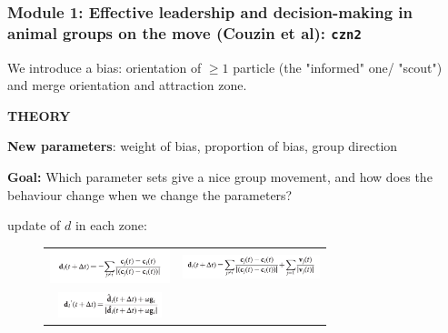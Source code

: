 \documentclass[compress]{beamer}
\begin{document}

\begin{frame}
  \frametitle{Module 1: Effective leadership and decision-making in animal groups on the move (Couzin et al): \texttt{czn2}}
  
  We introduce a bias: orientation of \( \geq 1 \) particle (the "informed" one/ "scout") and merge orientation and attraction zone.
  
  
  \hspace{1}
  
 
 \textbf{THEORY} 
 
 \hspace{1}
 
\textbf{New parameters}: weight of bias, proportion of bias, group direction

\textbf{Goal:} Which parameter sets give a nice group movement, and how does the behaviour change when we change the parameters?

\hspace{1}

update of \( d \) in each zone: \\
\begin{figure}
	\begin{tabular}{cc}
		\includegraphics[width=35mm]{./img/eq1.png} &   \includegraphics[width=40mm]{./img/eq2.png} \\
		\includegraphics[width=30mm]{./img/eq3.png} \\
	\end{tabular}
\end{figure}

\end{frame}


%	
%	
%	
%	
%	
\end{document}
